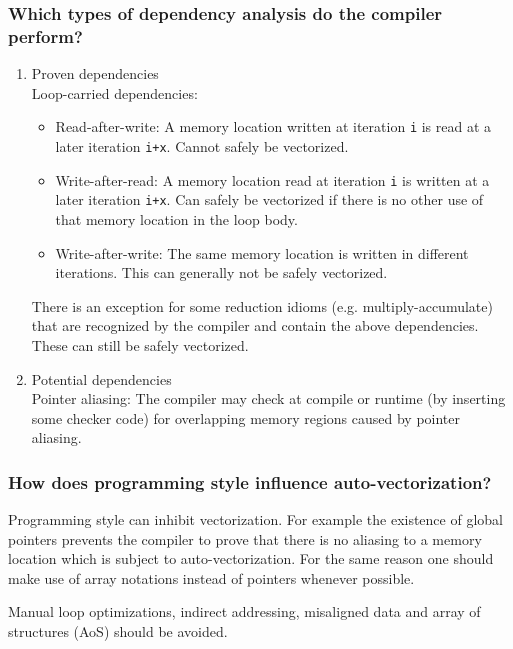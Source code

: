 \documentclass[11pt]{article}
\begin{document}
\subsubsection*{Which types of dependency analysis do the compiler perform?}
\begin{enumerate}
\item Proven dependencies\\Loop-carried dependencies:
\begin{itemize}
\item Read-after-write: A memory location written at iteration \texttt{i} is read at a later iteration \texttt{i+x}. Cannot safely be vectorized.
\item Write-after-read: A memory location read at iteration \texttt{i} is written at a later iteration \texttt{i+x}. Can safely be vectorized if there is no other use of that memory location in the loop body.
\item Write-after-write: The same memory location is written in different iterations. This can generally not be safely vectorized.
\end{itemize}
There is an exception for some reduction idioms (e.g. multiply-accumulate) that are recognized by the compiler and contain the above dependencies. These can still be safely vectorized.
\item Potential dependencies\\Pointer aliasing:
The compiler may check at compile or runtime (by inserting some checker code) for overlapping memory regions caused by pointer aliasing.
\end{enumerate}

\subsubsection*{How does programming style influence auto-vectorization?}
Programming style can inhibit vectorization. For example the existence of global pointers prevents the compiler to prove that there is no aliasing to a memory location which is subject to auto-vectorization. For the same reason one should make use of array notations instead of pointers whenever possible.

Manual loop optimizations, indirect addressing, misaligned data and array of structures (AoS) should be avoided.
\end{document}
